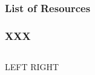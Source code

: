 \begin{frame}[label=x,allowframebreaks]
\frametitle{List of Resources}


\end{frame}




\begin{frame}
\frametitle{XXX}

\begin{columns}
	LEFT
	RIGHT
\end{columns}
\end{frame}


